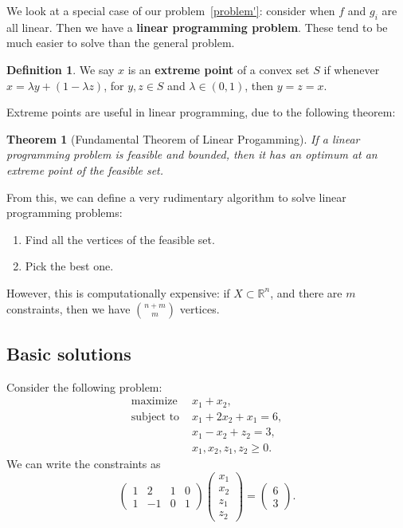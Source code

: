 \documentclass[12pt]{article}
\newtheorem{theorem}{Theorem}[section]
\theoremstyle{definition}
\newtheorem{definition}{Definition}[section]
\theoremstyle{remark}
\begin{document}
We look at a special case of our problem~\eqref{problem'}: consider when $f$ and $g_i$ are all linear. Then we have a \textbf{linear programming problem}. These tend to be much easier to solve than the general problem.

\begin{definition}
	We say $x$ is an \textbf{extreme point} of a convex set $S$ if whenever $x = \lambda y + (1 - \lambda z)$, for $y, z \in S$ and $\lambda \in (0, 1)$, then $y = z = x$.
\end{definition}

Extreme points are useful in linear programming, due to the following theorem:

\begin{theorem}[Fundamental Theorem of Linear Progamming]
	If a linear programming problem is feasible and bounded, then it has an optimum at an extreme point of the feasible set.
\end{theorem}

From this, we can define a very rudimentary algorithm to solve linear programming problems:
\begin{enumerate}[1)]
	\item Find all the vertices of the feasible set.
	\item Pick the best one.
\end{enumerate}

However, this is computationally expensive: if $X \subset \mathbb{R}^{n}$, and there are $m$ constraints, then we have $\binom{n+m}{m}$ vertices.

\subsection{Basic solutions}%
\label{sub:basic_solutions}

Consider the following problem:
\begin{align*}
	\text{maximize } & x_1 + x_2, \\
	\text{subject to } & x_1 + 2x_2 + x_1 = 6, \\
			  & x_1 - x_2 + z_2 = 3, \\
			  & x_1, x_2, z_1, z_2 \geq 0.
\end{align*}
We can write the constraints as
\[
\begin{pmatrix}
	1 & 2 & 1 & 0 \\
	1 & -1 & 0 & 1
\end{pmatrix}
\begin{pmatrix}
	x_1 \\
	x_2 \\
	z_1 \\
	z_2
\end{pmatrix}
=
\begin{pmatrix}
	6 \\
	3
\end{pmatrix}
.\]
\end{document}
